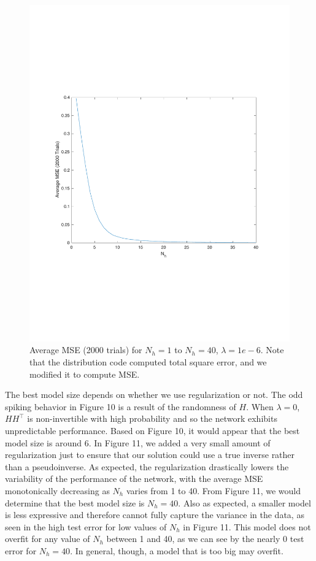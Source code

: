 \documentclass[]{article}
\begin{document}
\begin{figure}[H]
    \centering
    \includegraphics[width=0.55\linewidth]{problem2bReg1e-6.pdf}
    \caption{Average MSE (2000 trials) for $N_h=1$ to $N_h=40$, $\lambda=1e-6$. Note that the distribution code computed total square error, and we modified it to compute MSE.}
    \label{fig:my_label}
\end{figure}

The best model size depends on whether we use regularization or not. The odd spiking behavior in Figure 10 is a result of the randomness of $H$. When $\lambda=0$, $HH^\top$ is non-invertible with high probability and so the network exhibits unpredictable performance. Based on Figure 10, it would appear that the best model size is around 6. In Figure 11, we added a very small amount of regularization just to ensure that our solution could use a true inverse rather than a pseudoinverse. As expected, the regularization drastically lowers the variability of the performance of the network, with the average MSE monotonically decreasing as $N_h$ varies from 1 to 40. From Figure 11, we would determine that the best model size is $N_h=40$. Also as expected, a smaller model is less expressive and therefore cannot fully capture the variance in the data, as seen in the high test error for low values of $N_h$ in Figure 11. This model does not overfit for any value of $N_h$ between 1 and 40, as we can see by the nearly 0 test error for $N_h=40$. In general, though, a model that is too big may overfit. 
\end{document}
